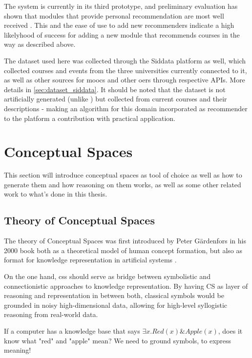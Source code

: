 The system is currently in its third prototype, and preliminary evaluation has shown that modules that provide personal recommendation are most well received \cite{Schurz2021}. This and the ease of use to add new recommenders indicate a high likelyhood of success for adding a new module that recommends courses in the way as described above.

The dataset used here was collected through the Siddata platform as well, which collected courses and events from the three universities currently connected to it, as well as other sources for \glspl{mooc} and other \glspl{oer} through respective APIs. More details in \autoref{sec:dataset_siddata}. It should be noted that the dataset is not artificially generated (unlike \mainalgos) but collected from current courses and their descriptions - making an algorithm for this domain incorporated as recommender to the platform a contribution with practical application.



\section{Conceptual Spaces}
\label{sec:cs}

This section will introduce conceptual spaces as tool of choice as well as how to generate them and how reasoning on them works, as well as some other related work to what's done in this thesis.

\subsection*{Theory of Conceptual Spaces}

The theory of Conceptual Spaces was first introduced by Peter Gärdenfors in his 2000 book  \cite{Gardenfors2000a} both as a theoretical model of human concept formation, but also as format for knowledge representation in artificial systems \cite{Gardenfors2004}. 

On the one hand, \glspl{cs} should serve as bridge between symbolistic and connectionistic approaches to knowledge representation. By having CS as layer of reasoning and representation in between both, classical symbols would be grounded in noisy high-dimensional data, allowing for high-level syllogistic reasoning from real-world data. 

If a computer has a knowledge base that says $\exists x.Red(x) \& Apple(x)$, does it know what "red" and "apple" mean? We need to ground symbols, to express meaning!


